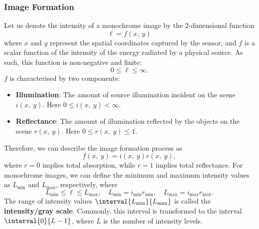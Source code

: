 \documentclass{article}
\begin{document}
\subsubsection{Image Formation}
Let us denote the intensity of a monochrome image by the 2-dimensional
function
\begin{equation*}
    \ell = f\left( x,\: y \right)
\end{equation*}
where \(x\) and \(y\) represent the spatial coordinates captured by the
sensor, and \(f\) is a scalar function of the intensity of the energy
radiated by a physical source. As such, this function is non-negative
and finite:
\begin{equation*}
    0 \leqslant \ell \leqslant \infty.
\end{equation*}
\(f\) is characterised by two components:
\begin{itemize}
    \item \textbf{Illumination}: The amount of source illumination incident on the
          scene \(i\left( x,\: y \right)\). Here \(0 \leqslant i\left( x,\: y \right) < \infty\).
    \item \textbf{Reflectance}: The amount of illumination reflected by
          the objects on the scene \(r\left( x,\: y \right)\). Here
          \(0 \leqslant r\left( x,\: y \right) \leqslant 1\).
\end{itemize}
Therefore, we can describe the image formation process as
\begin{equation*}
    f\left( x,\: y \right) = i\left( x,\: y \right) r\left( x,\: y \right),
\end{equation*}
where \(r = 0\) implies total absorption, while \(r = 1\) implies total reflectance.
For monochrome images, we can define the minimum and maximum intensity
values as \(L_{\text{min}}\) and \(L_{\text{max}}\), respectively,
where
\begin{equation*}
    L_{\text{min}} \leqslant \ell \leqslant L_{\text{max}}, \quad L_{\text{min}} = i_{\text{min}} r_{\text{min}}, \quad L_{\text{max}} = i_{\text{max}} r_{\text{max}}.
\end{equation*}
The range of intensity values \(\interval{L_{\text{min}}}{L_{\text{max}}}\)
is called the \textbf{intensity/gray scale}. Commonly, this interval is
transformed to the interval \(\interval{0}{L-1}\), where \(L\) is the
number of intensity levels.
\end{document}

